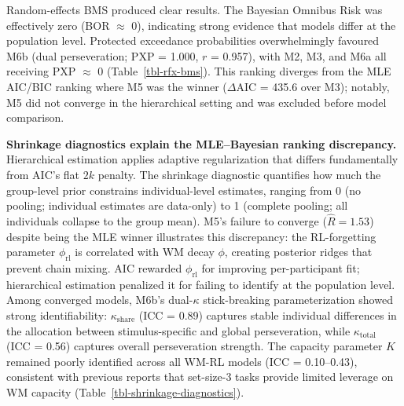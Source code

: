 \documentclass{article}
\begin{document}
Random-effects BMS \citep{stephan2009bayesian, rigoux2014bayesian}
produced clear results. The Bayesian Omnibus Risk was effectively zero
(BOR \(\approx\) 0), indicating strong evidence that models differ at
the population level. Protected exceedance probabilities overwhelmingly
favoured M6b (dual perseveration; PXP = 1.000, \(r\) = 0.957), with M2,
M3, and M6a all receiving PXP \(\approx\) 0 (Table~\ref{tbl-rfx-bms}).
This ranking diverges from the MLE AIC/BIC ranking where M5 was the
winner (\(\Delta\)AIC = 435.6 over M3); notably, M5 did not converge in
the hierarchical setting and was excluded before model comparison.

\textbf{Shrinkage diagnostics explain the MLE--Bayesian ranking
discrepancy.} Hierarchical estimation applies adaptive regularization
that differs fundamentally from AIC's flat \(2k\) penalty. The shrinkage
diagnostic \citep{gelman2013bayesian} quantifies how much the
group-level prior constrains individual-level estimates, ranging from 0
(no pooling; individual estimates are data-only) to 1 (complete pooling;
all individuals collapse to the group mean). M5's failure to converge
(\(\hat{R} = 1.53\)) despite being the MLE winner illustrates this
discrepancy: the RL-forgetting parameter \(\phi_{\text{rl}}\) is
correlated with WM decay \(\phi\), creating posterior ridges that
prevent chain mixing. AIC rewarded \(\phi_{\text{rl}}\) for improving
per-participant fit; hierarchical estimation penalized it for failing to
identify at the population level. Among converged models, M6b's
dual-\(\kappa\) stick-breaking parameterization showed strong
identifiability: \(\kappa_{\text{share}}\) (ICC = 0.89) captures stable
individual differences in the allocation between stimulus-specific and
global perseveration, while \(\kappa_{\text{total}}\) (ICC = 0.56)
captures overall perseveration strength. The capacity parameter \(K\)
remained poorly identified across all WM-RL models (ICC = 0.10--0.43),
consistent with previous reports that set-size-3 tasks provide limited
leverage on WM capacity (Table~\ref{tbl-shrinkage-diagnostics}).
\end{document}
